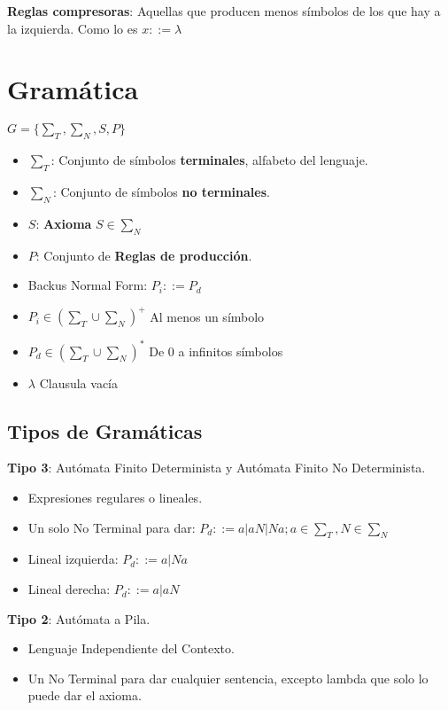 \documentclass[12pt, twoside, openright]{report} %
\begin{document}
\textbf{Reglas compresoras}: Aquellas que producen menos símbolos de los
que hay a la izquierda. Como lo es \(x::= \lambda\)

\section{Gramática}

\(G=\{ \sum_T, \sum_N, S, P\}\)

\begin{itemize}
	\item \(\sum_T\): Conjunto de símbolos \textbf{terminales}, alfabeto del
	      lenguaje.
	\item \(\sum_N\): Conjunto de símbolos \textbf{no terminales}.
	\item \(S\): \textbf{Axioma} \(S \in \sum_N\)
	\item \(P\): Conjunto de \textbf{Reglas de producción}.
	\item Backus Normal Form: \(P_i ::= P_d\)
	\item \(P_i \in (\sum_T \cup \sum_N)^+\) Al menos un símbolo
	\item \(P_d \in (\sum_T \cup \sum_N)^*\) De 0 a infinitos símbolos
	\item \(\lambda\) Clausula vacía
\end{itemize}


\subsection{Tipos de Gramáticas}

\textbf{Tipo 3}: Autómata Finito Determinista y Autómata Finito No
Determinista.

\begin{itemize}
	\item Expresiones regulares o lineales.
	\item Un solo No Terminal para dar:
	      \(P_d ::= a | aN | Na; a \in \sum_T, N \in \sum_N\)
	\item Lineal izquierda: \(P_d ::= a | Na\)
	\item Lineal derecha: \(P_d ::= a | aN\)
\end{itemize}

\textbf{Tipo 2}: Autómata a Pila.

\begin{itemize}
	\item Lenguaje Independiente del Contexto.
	\item Un No Terminal para dar cualquier sentencia, excepto lambda que solo
	      lo puede dar el axioma.
\end{itemize}
\end{document}
